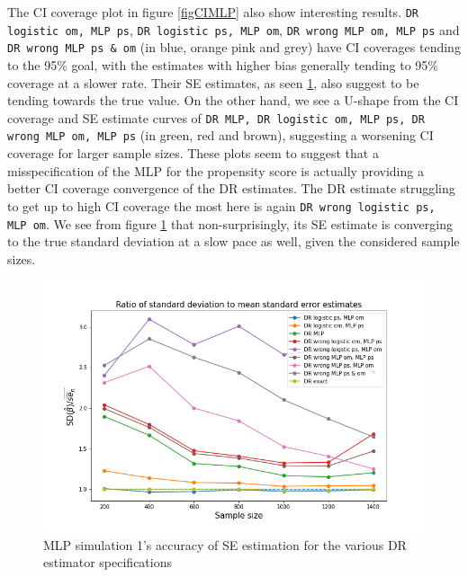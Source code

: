 \documentclass[12pt,twoside]{article}
\begin{document}
The CI coverage plot in figure \ref{figCIMLP} also show interesting results. \texttt{DR logistic om, MLP ps}, \texttt{DR logistic ps, MLP om}, \texttt{DR wrong MLP om, MLP ps} and \texttt{DR wrong MLP ps \& om} (in blue, orange pink and grey) have CI coverages tending to the 95\% goal, with the estimates with higher bias generally tending to 95\% coverage at a slower rate. Their SE estimates, as seen \ref{figSEMLP}, also suggest to be tending towards the true value. On the other hand, we see a U-shape from the CI coverage and SE estimate curves of \texttt{DR MLP, DR logistic om, MLP ps, DR wrong MLP om, MLP ps} (in green, red and brown), suggesting a worsening CI coverage for larger sample sizes. These plots seem to suggest that a misspecification of the MLP for the propensity score is actually providing a better CI coverage convergence of the DR estimates. The DR estimate struggling to get up to high CI coverage the most here is again \texttt{DR wrong logistic ps, MLP om}. We see from figure \ref{figSEMLP} that non-surprisingly, its SE estimate is converging to the true standard deviation at a slow pace as well, given the considered sample sizes. 

\begin{figure}[h!]
    \centering
    \includegraphics[width = 0.9\columnwidth]{figures/SEMLP.png}
    \caption{MLP simulation 1's accuracy of \citet{lunceford_davidian} SE estimation for the various DR estimator specifications}
    \label{figSEMLP}
\end{figure}
\end{document}
